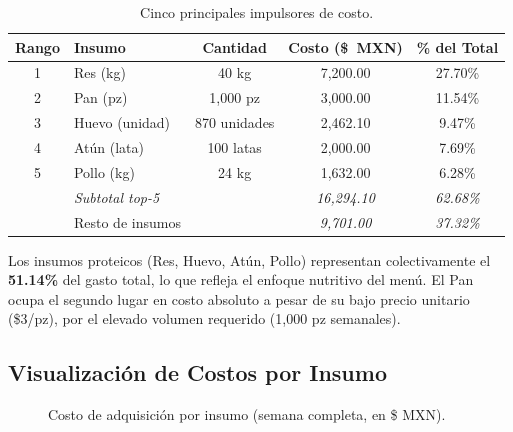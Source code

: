 \documentclass[12pt, a4paper]{article}
\begin{document}
\begin{table}[h!]
\centering
\renewcommand{\arraystretch}{1.3}
\begin{tabular}{clccc}
\toprule
\textbf{Rango} & \textbf{Insumo} & \textbf{Cantidad} & \textbf{Costo (\$~MXN)} & \textbf{\% del Total} \\
\midrule
1 & Res (kg)        & 40 kg        & 7{,}200.00 & 27.70\% \\
2 & Pan (pz)        & 1{,}000 pz   & 3{,}000.00 & 11.54\% \\
3 & Huevo (unidad)  & 870 unidades & 2{,}462.10 &  9.47\% \\
4 & Atún (lata)     & 100 latas    & 2{,}000.00 &  7.69\% \\
5 & Pollo (kg)      & 24 kg        & 1{,}632.00 &  6.28\% \\
\midrule
  & \textit{Subtotal top-5} & & \textit{16{,}294.10} & \textit{62.68\%} \\
  & Resto de insumos        & & \textit{9{,}701.00}  & \textit{37.32\%} \\
\bottomrule
\end{tabular}
\caption{Cinco principales impulsores de costo.}
\label{tab:top5}
\end{table}

Los insumos proteicos (Res, Huevo, Atún, Pollo) representan colectivamente el
\textbf{51.14\%} del gasto total, lo que refleja el enfoque nutritivo del menú.
El Pan ocupa el segundo lugar en costo absoluto a pesar de su bajo precio unitario
(\$3/pz), por el elevado volumen requerido (1{,}000 pz semanales).

\subsection{Visualización de Costos por Insumo}

\begin{figure}[h!]
\centering
{}
\caption{Costo de adquisición por insumo (semana completa, en \$ MXN).}
\label{fig:costos}
\end{figure}
\end{document}
